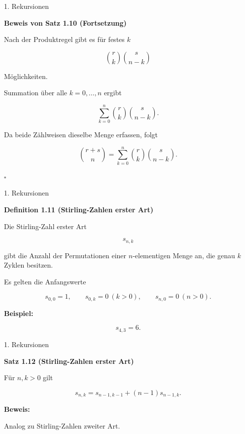 \documentclass{beamer}
\begin{document}
\begin{frame}{1. Rekursionen}

\textbf{Beweis von Satz 1.10 (Fortsetzung)}

Nach der Produktregel gibt es für festes \(k\)

\[
\binom{r}{k}\binom{s}{n-k}
\]

Möglichkeiten.

Summation über alle \(k=0,\ldots,n\) ergibt

\[
\sum_{k=0}^{n}
\binom{r}{k}\binom{s}{n-k}.
\]

Da beide Zählweisen dieselbe Menge erfassen, folgt

\[
\binom{r+s}{n}
=
\sum_{k=0}^{n}
\binom{r}{k}\binom{s}{n-k}.
\]

\hfill\(\square\)

\end{frame}

\begin{frame}{1. Rekursionen}

\textbf{Definition 1.11 (Stirling-Zahlen erster Art)}

\vspace{0.3cm}

Die Stirling-Zahl erster Art

\[
s_{n,k}
\]

gibt die Anzahl der Permutationen einer
\(n\)-elementigen Menge an, die genau
\(k\) Zyklen besitzen.

\vspace{0.4cm}

Es gelten die Anfangswerte

\[
s_{0,0}=1,
\qquad
s_{0,k}=0 \ (k>0),
\qquad
s_{n,0}=0 \ (n>0).
\]

\vspace{0.4cm}

\textbf{Beispiel:}

\[
s_{4,3}=6.
\]

\end{frame}

\begin{frame}{1. Rekursionen}

\textbf{Satz 1.12 (Stirling-Zahlen erster Art)}

\vspace{0.2cm}

Für \(n,k>0\) gilt

\[
s_{n,k}
=
s_{n-1,k-1}
+
(n-1)s_{n-1,k}.
\]

\vspace{0.3cm}

\textbf{Beweis:}

Analog zu Stirling-Zahlen zweiter Art. 

\end{frame}
\end{document}
